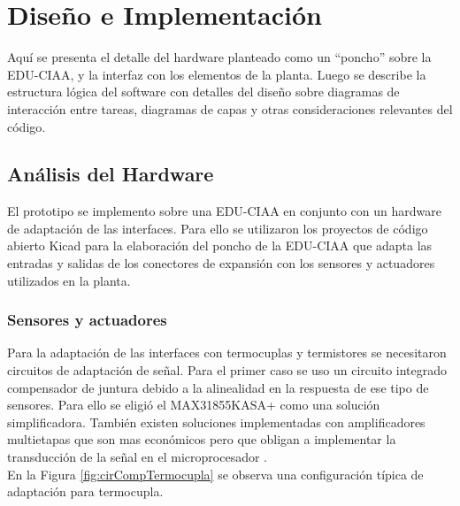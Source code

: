 \chapter{Diseño e Implementación} %
\label{Chapter3} %
Aquí se presenta el detalle del hardware planteado como un \enquote{poncho} sobre la EDU-CIAA, y la interfaz con los elementos de la planta. Luego se describe la estructura lógica del software con detalles del diseño sobre diagramas de interacción entre tareas, diagramas de capas y otras consideraciones relevantes del código.


\section{Análisis del Hardware}

El prototipo se implemento sobre una EDU-CIAA en conjunto con un hardware de adaptación de las interfaces. Para ello se utilizaron los proyectos de código abierto Kicad \citep{kicad} para la elaboración del poncho de la EDU-CIAA \citep{brengiponchos} que adapta las entradas y salidas de los conectores de expansión con los sensores y actuadores utilizados en la planta. 

\subsection{ Sensores y actuadores }


Para la adaptación de las interfaces con termocuplas y termistores se necesitaron circuitos de adaptación de señal. Para el primer caso se uso un circuito integrado compensador de juntura debido a la alinealidad en la respuesta de ese tipo de sensores. Para ello se eligió el MAX31855KASA+ \footnotemark como una solución simplificadora. 
También existen soluciones implementadas con amplificadores multietapas que son mas económicos pero que obligan a implementar la transducción de la señal en el microprocesador \citep{interOpamp}.\\
En la Figura \ref{fig:cirCompTermocupla} se observa una configuración típica de adaptación para termocupla.

